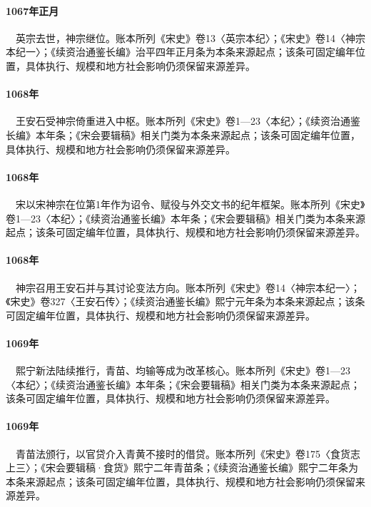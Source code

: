 \paragraph{1067年正月}　英宗去世，神宗继位。账本所列《宋史》卷13〈英宗本纪〉；《宋史》卷14〈神宗本纪一〉；《续资治通鉴长编》治平四年正月条为本条来源起点；该条可固定编年位置，具体执行、规模和地方社会影响仍须保留来源差异。

\paragraph{1068年}　王安石受神宗倚重进入中枢。账本所列《宋史》卷1—23〈本纪〉；《续资治通鉴长编》本年条；《宋会要辑稿》相关门类为本条来源起点；该条可固定编年位置，具体执行、规模和地方社会影响仍须保留来源差异。

\paragraph{1068年}　宋以宋神宗在位第1年作为诏令、赋役与外交文书的纪年框架。账本所列《宋史》卷1—23〈本纪〉；《续资治通鉴长编》本年条；《宋会要辑稿》相关门类为本条来源起点；该条可固定编年位置，具体执行、规模和地方社会影响仍须保留来源差异。

\paragraph{1068年}　神宗召用王安石并与其讨论变法方向。账本所列《宋史》卷14〈神宗本纪一〉；《宋史》卷327〈王安石传〉；《续资治通鉴长编》熙宁元年条为本条来源起点；该条可固定编年位置，具体执行、规模和地方社会影响仍须保留来源差异。

\paragraph{1069年}　熙宁新法陆续推行，青苗、均输等成为改革核心。账本所列《宋史》卷1—23〈本纪〉；《续资治通鉴长编》本年条；《宋会要辑稿》相关门类为本条来源起点；该条可固定编年位置，具体执行、规模和地方社会影响仍须保留来源差异。

\paragraph{1069年}　青苗法颁行，以官贷介入青黄不接时的借贷。账本所列《宋史》卷175〈食货志上三〉；《宋会要辑稿·食货》熙宁二年青苗条；《续资治通鉴长编》熙宁二年条为本条来源起点；该条可固定编年位置，具体执行、规模和地方社会影响仍须保留来源差异。

